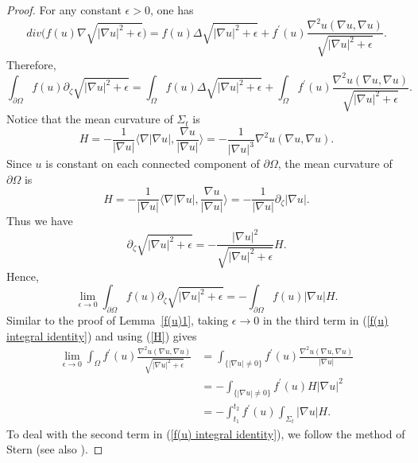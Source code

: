\documentclass[12pt]{article}
\theoremstyle{definition}
\theoremstyle{plain}
\numberwithin{equation}{section}
\begin{document}
\begin{proof}
For any constant $ \epsilon>0 $, one has
$$
div\Big(f(u)\nabla \sqrt{|\nabla u|^{2}+\epsilon}\Big)=f(u)\Delta \sqrt{|\nabla u|^{2}+\epsilon}+f^{\prime}(u)\frac{\nabla^{2}u(\nabla u,\nabla u)}{\sqrt{|\nabla u|^{2}+\epsilon}}.
$$
Therefore,
\begin{equation}\label{f(u) integral identity}
\int_{\partial \Omega}f(u)\partial_{\zeta}\sqrt{|\nabla u|^{2}+\epsilon}=\int_{\Omega}f(u)\Delta \sqrt{|\nabla u|^{2}+\epsilon}+\int_{\Omega}f^{\prime}(u)\frac{\nabla^{2}u(\nabla u,\nabla u)}{\sqrt{|\nabla u|^{2}+\epsilon}}.
\end{equation}
Notice that the mean curvature of $ \Sigma_{t} $ is 
\begin{equation}\label{H}
H=-\frac{1}{|\nabla u|}\Big\langle \nabla |\nabla u|,\frac{\nabla u}{|\nabla u|} \Big\rangle=-\frac{1}{|\nabla u|^{3}}\nabla^{2}u(\nabla u,\nabla u).
\end{equation}
Since $ u $ is constant on each connected component of $ \partial \Omega $, the mean curvature of $ \partial \Omega $ is
$$
H=-\frac{1}{|\nabla u|}\Big\langle \nabla |\nabla u|,\frac{\nabla u}{|\nabla u|} \Big\rangle=-\frac{1}{|\nabla u|}\partial_{\zeta}|\nabla u|.
$$
Thus we have 
$$
\partial_{\zeta}\sqrt{|\nabla u|^{2}+\epsilon}=-\frac{|\nabla u|^{2}}{\sqrt{|\nabla u|^{2}+\epsilon}}H.
$$
Hence,
\begin{equation}\label{f H}
\lim\limits_{\epsilon\to 0}\int_{\partial \Omega}f(u)\partial_{\zeta}\sqrt{|\nabla u|^{2}+\epsilon}=-\int_{\partial \Omega}f(u)|\nabla u|H.
\end{equation}
Similar to the proof of Lemma~\ref{f(u)1}, taking $ \epsilon \to 0 $ in the third term in (\ref{f(u) integral identity}) and using (\ref{H}) gives
\begin{equation}\label{f hess}
\begin{aligned}
\lim\limits_{\epsilon\to 0}\int_{\Omega}f^{\prime}(u)\frac{\nabla^{2}u(\nabla u, \nabla u)}{\sqrt{|\nabla u|^{2}+\epsilon}}&=\int_{\{|\nabla u|\neq 0\}}f^{\prime}(u)\frac{\nabla^{2}u(\nabla u, \nabla u)}{|\nabla u|}\\
&=-\int_{\{|\nabla u|\neq 0\}}f^{\prime}(u)H|\nabla u|^{2}\\
&=-\int_{t_{1}}^{t_{2}}f^{\prime}(u)\int_{\Sigma_{t}}|\nabla u|H.
\end{aligned}
\end{equation}
To deal with the second term in (\ref{f(u) integral identity}), we follow the method of Stern \cite{Stern} (see also \cite{Miao}).


\end{proof}
\end{document}
